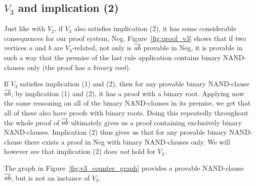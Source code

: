 \subsection{$V_3$ and implication (2)}
\label{sub:V3 and implication 2}
Just like with $V_2$, if $V_3$ also satisfies implication (2), it has some considerable consequences for our proof system, Neg.
Figure~\ref{fig:proof_v3} shows that if two vertices $a$ and $b$ are $V_3$-related, not only is $\ol{ab}$ provable in Neg, it is provable in such a way that the premise of the last rule application contains binary NAND-clauses only (the proof has a \textit{binary root}).

If $V_3$ satisfies implication (1) and (2), then for any provable binary NAND-clause $\ol{ab}$, by implication (1) and (2), it has a proof with a binary root.
Applying now the same reasoning on all of the binary NAND-clauses in its premise, we get that all of these also have proofs with binary roots.
Doing this repeatedly throughout the whole proof of $\ol{ab}$ ultimately gives us a proof containing exclusively binary NAND-clauses.
Implication (2) thus gives us that for any provable binary NAND-clause there exists a proof in Neg with binary NAND-clauses only.
We will however see that implication (2) does \textit{not} hold for $V_3$.\par

The graph in Figure~\ref{fig:v3_counter_graph} provides a provable NAND-clause $\ol{ab}$, but is not an instance of $V_3$.

